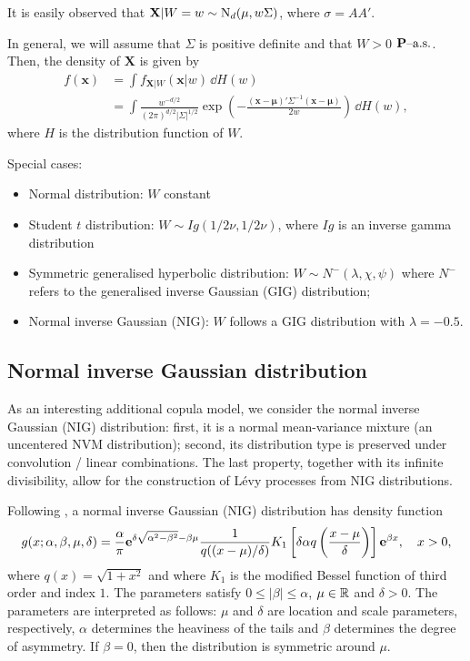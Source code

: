 It is easily observed that $\mathbf X|W=w \sim {\rm N}_d(\mathbf \mu,
w\Sigma)$, where $\sigma = A A'$.

In general, we will assume that $\Sigma$ is positive definite and that
$W>0$ $\text{{\bf P}--a.s.}$. Then, the density of $\mathbf X$ is given by
\begin{align*}
  f(\mathbf x) &= \int f_{\mathbf X|W} (\mathbf x|w)\, \dd H(w)\\
  &= \int \frac{w^{-d/2}} {(2\pi)^{d/2} |\Sigma|^{1/2}} \exp\left( -
    \frac{(\mathbf x-\mathbf \mu)' \Sigma^{-1} (\mathbf x-\mathbf
    \mu)} {2w} \right)\, \dd H(w),
\end{align*}
where $H$ is the distribution function of $W$.

Special cases:
\begin{itemize}
\item Normal distribution: $W$ constant
\item Student $t$ distribution: $W\sim \displaystyle Ig(1/2 \nu, 1/2
  \nu)$, where $Ig$ is an inverse gamma distribution
\item Symmetric generalised hyperbolic distribution: $W\sim
  N^{-}(\lambda, \chi, \psi)$ where $N^{-}$ refers to
  the generalised inverse Gaussian (GIG) distribution;
\item Normal inverse Gaussian (NIG): $W$ follows a GIG distribution
  with $\lambda=-0.5$.  
\end{itemize}

\subsection{Normal inverse Gaussian distribution}

As an interesting additional copula model, we consider the normal
inverse Gaussian (NIG) distribution: first, it is a normal
mean-variance mixture (an uncentered NVM distribution); second, its
distribution type is preserved under 
convolution / linear combinations. The last property, together with
its infinite divisibility, allow for the construction of L\'evy
processes from NIG distributions. 

Following \citep{BarndorffNielsen1997}, a normal inverse Gaussian
(NIG) distribution has density function
\begin{equation*}
  g(x; \alpha,\beta, \mu, \delta) = \frac{\alpha}{\pi} {\bf e}^{\delta
    \sqrt{\alpha^2-\beta^2} -\beta\mu} \frac{1}{q((x-\mu)/\delta)}
  K_1\left[\delta \alpha q\left(\frac{x-\mu}{\delta}\right) \right]
  {\bf e}^{\beta x},\quad x>0,
\end{equation*}
where $q(x) = \sqrt{1+x^2}$ and where $K_1$ is the modified Bessel
function of third order and index $1$. The parameters satisfy $0\leq
|\beta|\leq \alpha$, $\mu\in {\mathbb{R}}$ and $\delta>0$. The parameters are
interpreted as follows: $\mu$ and $\delta$ are location and scale
parameters, respectively, $\alpha$
determines the heaviness of the tails and $\beta$ determines the degree
of asymmetry. If $\beta=0$, then the distribution is symmetric around
$\mu$. 

